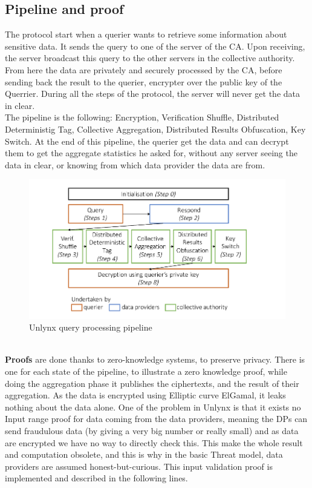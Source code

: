 \documentclass{article}
\begin{document}
\subsection{Pipeline and proof}
The protocol start when a querier wants to retrieve some information about sensitive data. It sends the query to one of the server of the CA. Upon receiving, the server broadcast this query to the other servers in the collective authority.\\
From here the data are privately and securely processed by the CA, before sending back the result to the querier, encrypter over the public key of the Querrier. During all the steps of the protocol, the server will never get the data in clear.\\
The pipeline is the following: Encryption, Verification Shuffle, Distributed Deterministig Tag, Collective Aggregation, Distributed Results Obfuscation, Key Switch. At the end of this pipeline, the querier get the data and can decrypt them to get the aggregate statistics he asked for, without any server seeing the data in clear, or knowing from which data provider the data are from.
\begin{figure}[h]
\centering
\includegraphics[scale=0.5]{img/unlynxPip.png}
\caption{Unlynx query processing pipeline}
\end{figure}
\\
\textbf{Proofs} are done thanks to zero-knowledge systems, to preserve privacy. There is one for each state of the pipeline, to illustrate a zero knowledge proof, while doing the aggregation phase it publishes the ciphertexts, and the result of their aggregation. As the data is encrypted using Elliptic curve ElGamal, it leaks nothing about the data alone. One of the problem in Unlynx is that it exists no Input range proof for data coming from the data providers, meaning the DPs can send fraudulous data (by giving a very big number or really small) and as data are encrypted we have no way to directly check this. This make the whole result and computation obsolete, and this is why in the basic Threat model, data providers are assumed honest-but-curious. This input validation proof is implemented and described in the following lines.\\
\end{document}
